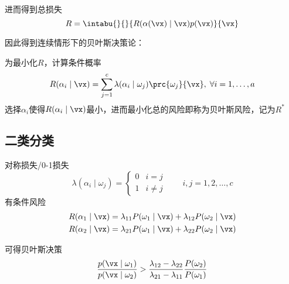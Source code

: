 进而得到总损失
\[R=\intabu{}{}{R(\alpha(\vx)\mid\vx)p(\vx)}{\vx}\]

因此得到连续情形下的贝叶斯决策论：
\begin{theorem}
为最小化$R$，计算条件概率
\[R(\alpha_i\mid\vx)=\sum_{j=1}^c\lambda(\alpha_i\mid\omega_j)\prc{\omega_j}{\vx},\;\forall i=1,\ldots,a\]
选择$\alpha_i$使得$R(\alpha_i\mid\vx)$最小，进而最小化总的风险即称为贝叶斯风险，记为$R^*$
\end{theorem}

\subsection{二类分类}
对称损失/0-1损失
\[\lambda(\alpha_i\mid\omega_j)=
\begin{cases}
0 & i=j\\
1 & i\ne j
\end{cases}
\qquad i,j=1,2,\ldots,c\]
有条件风险
\[\begin{aligned}
R(\alpha_1\mid\vx)&=\lambda_{11}P(\omega_1\mid\vx)+\lambda_{12}P(\omega_2\mid\vx)\\
R(\alpha_2\mid\vx)&=\lambda_{21}P(\omega_1\mid\vx)+\lambda_{22}P(\omega_2\mid\vx)
\end{aligned}\]

可得贝叶斯决策
\[\frac{p(\vx\mid\omega_1)}{p(\vx\mid\omega_2)}>\frac{\lambda_{12}-\lambda_{22}}{\lambda_{21}-\lambda_{11}}\frac{P(\omega_2)}{P(\omega_1)}\]